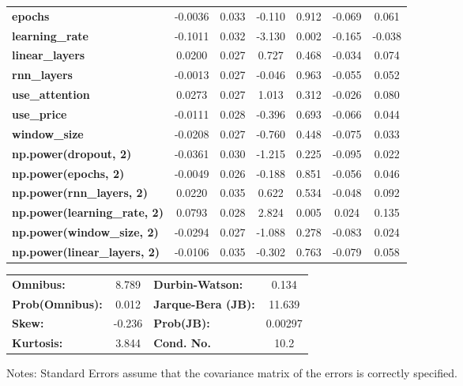 \begin{center}
\begin{tabular}{lcccccc}
\textbf{epochs}                            &      -0.0036  &        0.033     &    -0.110  &         0.912        &       -0.069    &        0.061     \\
\textbf{learning\_rate}                    &      -0.1011  &        0.032     &    -3.130  &         0.002        &       -0.165    &       -0.038     \\
\textbf{linear\_layers}                    &       0.0200  &        0.027     &     0.727  &         0.468        &       -0.034    &        0.074     \\
\textbf{rnn\_layers}                       &      -0.0013  &        0.027     &    -0.046  &         0.963        &       -0.055    &        0.052     \\
\textbf{use\_attention}                    &       0.0273  &        0.027     &     1.013  &         0.312        &       -0.026    &        0.080     \\
\textbf{use\_price}                        &      -0.0111  &        0.028     &    -0.396  &         0.693        &       -0.066    &        0.044     \\
\textbf{window\_size}                      &      -0.0208  &        0.027     &    -0.760  &         0.448        &       -0.075    &        0.033     \\
\textbf{np.power(dropout, 2)}              &      -0.0361  &        0.030     &    -1.215  &         0.225        &       -0.095    &        0.022     \\
\textbf{np.power(epochs, 2)}               &      -0.0049  &        0.026     &    -0.188  &         0.851        &       -0.056    &        0.046     \\
\textbf{np.power(rnn\_layers, 2)}          &       0.0220  &        0.035     &     0.622  &         0.534        &       -0.048    &        0.092     \\
\textbf{np.power(learning\_rate, 2)}       &       0.0793  &        0.028     &     2.824  &         0.005        &        0.024    &        0.135     \\
\textbf{np.power(window\_size, 2)}         &      -0.0294  &        0.027     &    -1.088  &         0.278        &       -0.083    &        0.024     \\
\textbf{np.power(linear\_layers, 2)}       &      -0.0106  &        0.035     &    -0.302  &         0.763        &       -0.079    &        0.058     \\
\bottomrule
\end{tabular}
\begin{tabular}{lclc}
\textbf{Omnibus:}       &  8.789 & \textbf{  Durbin-Watson:     } &    0.134  \\
\textbf{Prob(Omnibus):} &  0.012 & \textbf{  Jarque-Bera (JB):  } &   11.639  \\
\textbf{Skew:}          & -0.236 & \textbf{  Prob(JB):          } &  0.00297  \\
\textbf{Kurtosis:}      &  3.844 & \textbf{  Cond. No.          } &     10.2  \\
\bottomrule
\end{tabular}
\end{center}

Notes: \newline
 [1] Standard Errors assume that the covariance matrix of the errors is correctly specified.